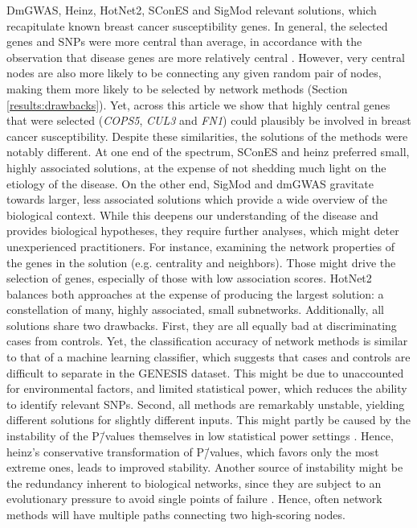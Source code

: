 \documentclass[10pt,letterpaper]{article}
\begin{document}
DmGWAS, Heinz, HotNet2, SConES and SigMod relevant solutions, which recapitulate known breast cancer susceptibility genes. In general, the selected genes and SNPs were more central than average, in accordance with the observation that disease genes are more relatively central \cite{pinero_uncovering_2016}. However, very central nodes are also more likely to be connecting any given random pair of nodes, making them more likely to be selected by network methods (Section \ref{results:drawbacks}). Yet, across this article we show that highly central genes that were selected (\emph{COPS5}, \emph{CUL3} and \emph{FN1}) could plausibly be involved in breast cancer susceptibility. Despite these similarities, the solutions of the methods were notably different. At one end of the spectrum, SConES and heinz preferred small, highly associated solutions, at the expense of not shedding much light on the etiology of the disease. On the other end, SigMod and dmGWAS gravitate towards larger, less associated solutions which provide a wide overview of the biological context. While this deepens our understanding of the disease and provides biological hypotheses, they require further analyses, which might deter unexperienced practitioners. For instance, examining the network properties of the genes in the solution (e.g. centrality and neighbors). Those might drive the selection of genes, especially of those with low association scores. HotNet2 balances both approaches at the expense of producing the largest solution: a constellation of many, highly associated, small subnetworks. Additionally, all solutions share two drawbacks. First, they are all equally bad at discriminating cases from controls. Yet, the classification accuracy of network methods is similar to that of a machine learning classifier, which suggests that cases and controls are difficult to separate in the GENESIS dataset. This might be due to unaccounted for environmental factors, and limited statistical power, which reduces the ability to identify relevant SNPs. Second, all methods are remarkably unstable, yielding different solutions for slightly different inputs. This might partly be caused by the instability of the P\=/values themselves in low statistical power settings \cite{halseyFickleValueGenerates2015}. Hence, heinz's conservative transformation of P\=/values, which favors only the most extreme ones, leads to improved stability. Another source of instability might be the redundancy inherent to biological networks, since they are subject to an evolutionary pressure to avoid single points of failure \cite{wagnerAlternativeRoutesMutational2007}. Hence, often network methods will have multiple paths connecting two high-scoring nodes. 
\end{document}
